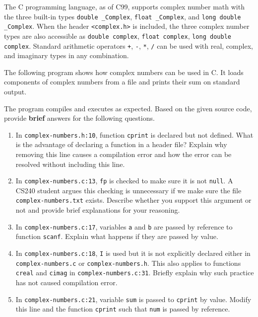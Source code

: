 \documentclass[12pt,letterpaper,twoside]{article}
\begin{document}
The C programming language, as of C99, supports complex number math with the three built-in types \texttt{double \_Complex}, \texttt{float \_Complex}, and \texttt{long double \_Complex}.
When the header \texttt{<complex.h>} is included, the three complex number types are also accessible as \texttt{double complex}, \texttt{float complex}, \texttt{long double complex}.
Standard arithmetic operators \texttt{+}, \texttt{-}, \texttt{*}, \texttt{/} can be used with real, complex, and imaginary types in any combination.

The following program shows how complex numbers can be used in C. It loads components of complex numbers from a file and prints their sum on standard output.

\lstset{language=c,tabsize=4}



The program compiles and executes as expected.
Based on the given source code, provide \textbf{brief} answers for the following questions.

\begin{enumerate}
\item
In \texttt{complex-numbers.h:10}, function \texttt{cprint} is declared but not defined.
What is the advantage of declaring a function in a header file?
Explain why removing this line causes a compilation error and how the error can be resolved without including this line.

\item
In \texttt{complex-numbers.c:13}, \texttt{fp} is checked to make sure it is not \texttt{null}.
A CS240 student argues this checking is unnecessary if we make sure the file \texttt{complex-numbers.txt} exists.
Describe whether you support this argument or not and provide brief explanations for your reasoning.

\item
In \texttt{complex-numbers.c:17}, variables \texttt{a} and \texttt{b} are passed by reference to function \texttt{scanf}.
Explain what happens if they are passed by value.

\item
In \texttt{complex-numbers.c:18}, \texttt{I} is used but it is not explicitly declared either in \texttt{complex-numbers.c} or \texttt{complex-numbers.h}.
This also applies to functions \texttt{creal} and \texttt{cimag} in \texttt{complex-numbers.c:31}.
Briefly explain why such practice has not caused compilation error.

\item
In \texttt{complex-numbers.c:21}, variable \texttt{sum} is passed to \texttt{cprint} by value. Modify this line and the function \texttt{cprint} such that \texttt{num} is passed by reference.

\end{enumerate}
\end{document}
